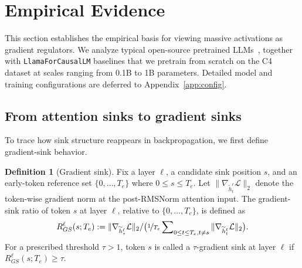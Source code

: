 \documentclass{article}
\theoremstyle{plain}
\theoremstyle{definition}
\newtheorem{definition}{Definition}
\theoremstyle{remark}
\begin{document}
\section{Empirical Evidence}
\label{sec:as_to_gs}

This section establishes the empirical basis for viewing massive activations as gradient regulators.
We analyze typical open-source pretrained LLMs~\cite{qwen2.5,qwen3,grattafiori2024llama3herdmodels,glm2024chatglm}, together with \texttt{LlamaForCausalLM} baselines that we pretrain from scratch on the C4~\cite{raffel2020exploring} dataset at scales ranging from 0.1B to 1B parameters. Detailed model and training configurations are deferred to Appendix~\ref{app:config}.

\subsection{From attention sinks to gradient sinks}\label{sec:gs}

To trace how sink structure reappears in backpropagation, we first define gradient-sink behavior.

\begin{definition}[Gradient sink]\label{def:gradient_sink}
Fix a layer $\ell$, a candidate sink position $s$, and an early-token reference set $\{0,\dots,T_e\}$ where $0\le s\le T_e$.
Let $\|\nabla_{\widetilde h_t^\ell}\mathcal L\|_2$ denote the token-wise gradient norm at the post-RMSNorm attention input. The gradient-sink ratio of token $s$ at layer $\ell$, relative to $\{0,\dots,T_e\}$, is defined as
\begin{equation}\label{eq:gs_def}
R_{GS}^{\ell}(s;T_e) :=
\|\nabla_{\widetilde h_s^{\ell}} \mathcal{L}\|_2 /
\big( \nicefrac{1}{T_e} \sum\nolimits_{0 \le t \le T_e, t\ne s} \|\nabla_{\widetilde h_t^{\ell}} \mathcal{L}\|_2 \big).
\end{equation}
For a prescribed threshold $\tau>1$, token $s$ is called a $\tau$-gradient sink at layer $\ell$ if $R_{GS}^{\ell}(s;T_e)\ge \tau$.
\end{definition}
\end{document}
